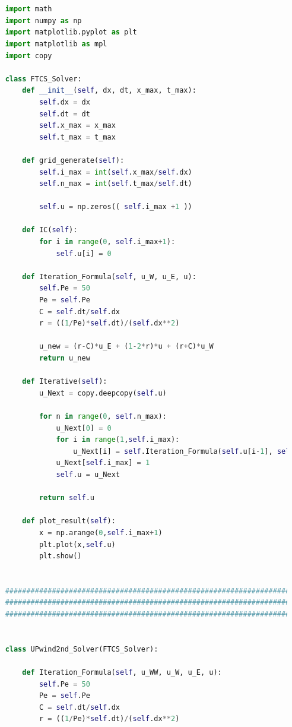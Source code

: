 \documentclass[12pt]{article}
\begin{document}
\begin{scriptsize}
\begin{lstlisting}[language=python,caption={Problem2, 2nd UPwind Solver updated}]


    import math
    import numpy as np
    import matplotlib.pyplot as plt
    import matplotlib as mpl
    import copy
    
    class FTCS_Solver:
        def __init__(self, dx, dt, x_max, t_max):
            self.dx = dx
            self.dt = dt
            self.x_max = x_max
            self.t_max = t_max
    
        def grid_generate(self):
            self.i_max = int(self.x_max/self.dx)
            self.n_max = int(self.t_max/self.dt)
    
            self.u = np.zeros(( self.i_max +1 ))
    
        def IC(self):
            for i in range(0, self.i_max+1):
                self.u[i] = 0
    
        def Iteration_Formula(self, u_W, u_E, u):
            self.Pe = 50
            Pe = self.Pe
            C = self.dt/self.dx
            r = ((1/Pe)*self.dt)/(self.dx**2)
    
            u_new = (r-C)*u_E + (1-2*r)*u + (r+C)*u_W
            return u_new
    
        def Iterative(self):
            u_Next = copy.deepcopy(self.u)
    
            for n in range(0, self.n_max):
                u_Next[0] = 0
                for i in range(1,self.i_max):
                    u_Next[i] = self.Iteration_Formula(self.u[i-1], self.u[i+1], self.u[i])
                u_Next[self.i_max] = 1
                self.u = u_Next
    
            return self.u
        
        def plot_result(self):
            x = np.arange(0,self.i_max+1)
            plt.plot(x,self.u)
            plt.show()
    
    
    ###############################################################################################
    ###############################################################################################
    ###############################################################################################
    
    
    class UPwind2nd_Solver(FTCS_Solver):
        
        def Iteration_Formula(self, u_WW, u_W, u_E, u):
            self.Pe = 50
            Pe = self.Pe
            C = self.dt/self.dx
            r = ((1/Pe)*self.dt)/(self.dx**2)
            

\end{lstlisting}
\end{scriptsize}
\end{document}
